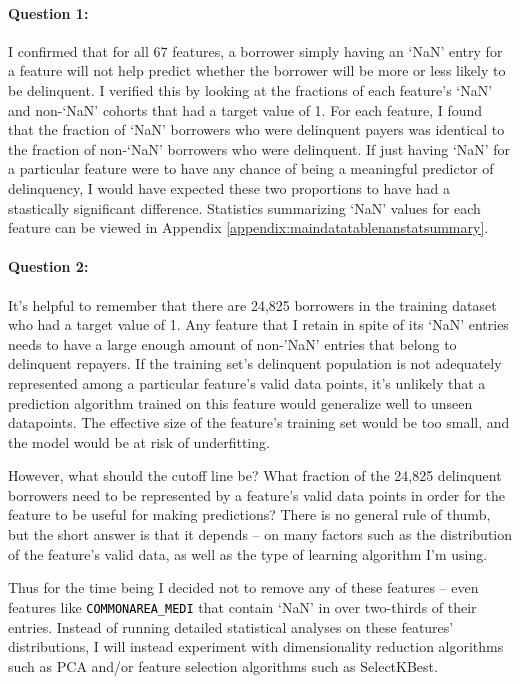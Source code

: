 \documentclass[12pt, letterpaper]{article}
\begin{document}
\paragraph{Question 1:}
I confirmed that for all 67 features, a borrower simply having an `NaN' entry for a feature will not help predict whether the borrower will be more or less likely to be delinquent. I verified this by looking at the fractions of each feature's `NaN' and non-`NaN' cohorts that had a target value of 1. For each feature, I found that the fraction of `NaN' borrowers who were delinquent payers was identical to the fraction of non-`NaN' borrowers who were delinquent. If just having `NaN' for a particular feature were to have any chance of being a meaningful predictor of delinquency, I would have expected these two proportions to have had a stastically significant difference. Statistics summarizing `NaN' values for each feature can be viewed in Appendix \ref{appendix:maindatatablenanstatsummary}.

\paragraph{Question 2:}
It's helpful to remember that there are 24,825 borrowers in the training dataset who had a target value of 1. Any feature that I retain in spite of its `NaN' entries needs to have a large enough amount of non-'NaN' entries that belong to delinquent repayers. If the training set's delinquent population is not adequately represented among a particular feature's valid data points, it's unlikely that a prediction algorithm trained on this feature would generalize well to unseen datapoints. The effective size of the feature's training set would be too small, and the model would be at risk of underfitting.

However, what should the cutoff line be? What fraction of the 24,825 delinquent borrowers need to be represented by a feature's valid data points in order for the feature to be useful for making predictions? There is no general rule of thumb, but the short answer is that it depends -- on many factors such as the distribution of the feature's valid data, as well as the type of learning algorithm I'm using.

Thus for the time being I decided not to remove any of these features -- even features like \colorbox{backcolor}{\textcolor{black}{\texttt{COMMONAREA_MEDI}}} that contain `NaN' in over two-thirds of their entries. Instead of running detailed statistical analyses on these features' distributions, I will instead experiment with dimensionality reduction algorithms such as PCA and/or feature selection algorithms such as SelectKBest.
\end{document}
